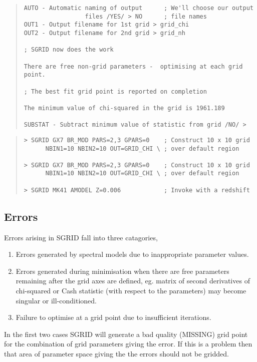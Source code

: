 \documentclass{book}
\renewcommand{\_}{{\tt\char'137}}     %
\begin{document}
\begin{quote}
\begin{verbatim}
AUTO - Automatic naming of output      ; We'll choose our output
                 files /YES/ > NO      ; file names
OUT1 - Output filename for 1st grid > grid_chi
OUT2 - Output filename for 2nd grid > grid_nh
 
; SGRID now does the work
 
There are free non-grid parameters -  optimising at each grid point.
 
; The best fit grid point is reported on completion
 
The minimum value of chi-squared in the grid is 1961.189
 
SUBSTAT - Subtract minimum value of statistic from grid /NO/ >
\end{verbatim}\end{quote}
\begin{quote}\begin{verbatim}
> SGRID GX7 BR_MOD PARS=2,3 GPARS=0    ; Construct 10 x 10 grid
      NBIN1=10 NBIN2=10 OUT=GRID_CHI \ ; over default region
 
> SGRID GX7 BR_MOD PARS=2,3 GPARS=0    ; Construct 10 x 10 grid
      NBIN1=10 NBIN2=10 OUT=GRID_CHI \ ; over default region
 
> SGRID MK41 AMODEL Z=0.006            ; Invoke with a redshift
\end{verbatim}\end{quote}
\subsection{Errors}
Errors arising in SGRID fall into three catagories,
 
\begin{enumerate}
\item Errors generated by spectral models due to inappropriate
parameter values.
\item Errors generated during minimisation when there are free
parameters remaining after the grid axes are defined, eg.
matrix of second derivatives of chi-squared or Cash
statistic (with respect to the parameters) may become
singular or ill-conditioned.
\item Failure to optimise at a grid point due to insufficient
iterations.
\end{enumerate}
In the first two cases SGRID will generate a bad quality (MISSING)
grid point for the combination of grid parameters giving the error.
If this is a problem then that area of parameter space giving the
the errors should not be gridded.
 
\end{document}
